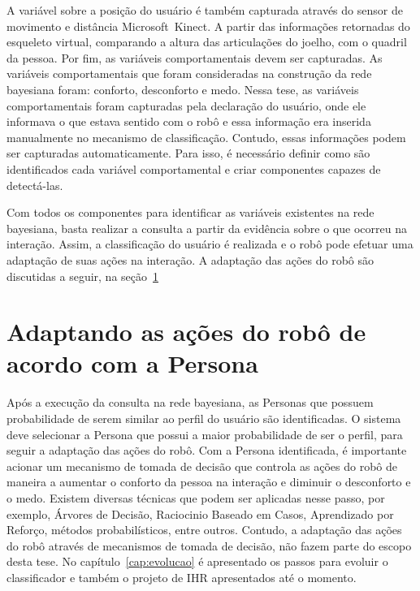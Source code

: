 A variável sobre a posição do usuário é também capturada através do sensor de movimento e distância Microsoft\textregistered\ Kinect\textregistered. A partir das informações retornadas do esqueleto virtual, comparando a altura das articulações do joelho, com o quadril da pessoa. Por fim, as variáveis comportamentais devem ser capturadas. As variáveis comportamentais que foram consideradas na construção da rede bayesiana foram: conforto, desconforto e medo. Nessa tese, as variáveis comportamentais foram capturadas pela declaração do usuário, onde ele informava o que estava sentido com o robô e essa informação era inserida manualmente no mecanismo de classificação. Contudo, essas informações podem ser capturadas automaticamente. Para isso, é necessário definir como são identificados cada variável comportamental e criar componentes capazes de detectá-las.

Com todos os componentes para identificar as variáveis existentes na rede bayesiana, basta realizar a consulta a partir da evidência sobre o que ocorreu na interação. Assim, a classificação do usuário é realizada e o robô pode efetuar uma adaptação de suas ações na interação. A adaptação das ações do robô são discutidas a seguir, na seção~\ref{sec:classificapersona}

\section{Adaptando as ações do robô de acordo com a Persona}
\label{sec:classificapersona}
Após a execução da consulta na rede bayesiana, as Personas que possuem probabilidade de serem similar ao perfil do usuário são identificadas. O sistema deve selecionar a Persona que possui a maior probabilidade de ser o perfil, para seguir a adaptação das ações do robô. Com a Persona identificada, é importante acionar um mecanismo de tomada de decisão que controla as ações do robô de maneira a aumentar o conforto da pessoa na interação e diminuir o desconforto e o medo. Existem diversas técnicas que podem ser aplicadas nesse passo, por exemplo, Árvores de Decisão, Raciocinio Baseado em Casos, Aprendizado por Reforço, métodos probabilísticos, entre outros. Contudo, a adaptação das ações do robô através de mecanismos de tomada de decisão, não fazem parte do escopo desta tese. No capítulo~\ref{cap:evolucao} é apresentado os passos para evoluir o classificador e também o projeto de IHR apresentados até o momento.
